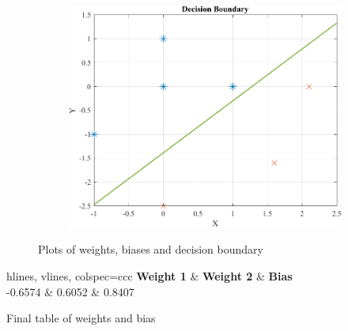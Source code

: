 \begin{figure}[htpb]
\begin{subfigure}[c]{0.3\textwidth}
	\end{subfigure}
	\hspace{1mm}
	\begin{subfigure}[l]{0.3\textwidth}
		\centering
		\includegraphics[width=\textwidth]{../Problem 10/prob10_adaline_decision_boundary.pdf}
		\caption{}
		\label{fig:prob10_decision_boundary}
	\end{subfigure}
	\caption{Plots of weights, biases and decision boundary}
	\label{fig:prob10_plot_weights_biases}
\end{figure}

\begin{table}[H]
	\centering
	\begin{tblr}{hlines, vlines, colspec={ccc}}
		\textbf{Weight 1} & \textbf{Weight 2} & \textbf{Bias} \\
		-0.6574 & 0.6052 & 0.8407 \\
	\end{tblr}
	\caption{Final table of weights and bias}
	\label{table:prob10_final_weight_bias}
\end{table}